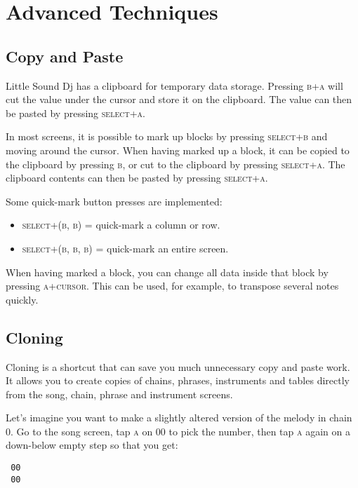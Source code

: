 \chapter{Advanced Techniques}

\section{Copy and Paste} \label{copy-paste}

Little Sound Dj has a clipboard for temporary data storage. Pressing \textsc{b+a} will cut the value
under the cursor and store it on the clipboard. The value can then be pasted by pressing
\textsc{select+a}.

In most screens, it is possible to mark up blocks by pressing \textsc{select+b} and moving around
the cursor. When having marked up a block, it can be copied to the clipboard by pressing \textsc{b},
or cut to the clipboard by pressing \textsc{select+a}. The clipboard contents can then be pasted by
pressing \textsc{select+a}.

Some quick-mark button presses are implemented:
\begin{itemize}
\item \textsc{select+(b, b)} = quick-mark a column or row.
\item \textsc{select+(b, b, b)} = quick-mark an entire screen.
\end{itemize}

When having marked a block, you can change all data inside that block by pressing \textsc{a+cursor}. This can be used, for example, to transpose several notes quickly.

\section{Cloning} \label{cloning}

Cloning is a shortcut that can save you much unnecessary copy and paste work.
It allows you to create copies of chains, phrases, instruments and tables directly from the song, chain, phrase and instrument screens.

Let's imagine you want to make a slightly altered version of the melody in chain 0. Go to the song screen, tap \textsc{a} on 00 to pick the number, then tap \textsc{a} again on a down-below empty step so that you get:

\begin{verbatim}
 00
 00
\end{verbatim}

